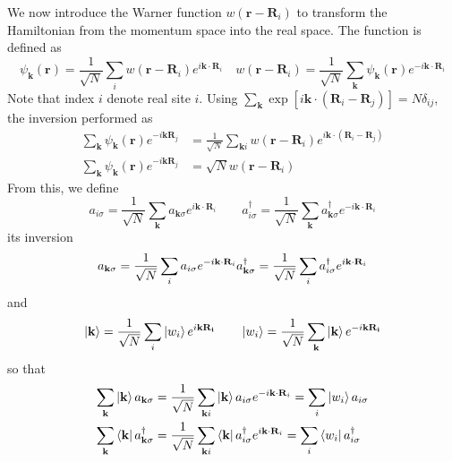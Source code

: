 \documentclass[../../../main.tex]{subfiles}
\begin{document}
We now introduce the Warner function $w(\mathbf{r} - \mathbf{R}_i)$ to transform the Hamiltonian from the momentum space into the real space.
The function is defined as
\begin{equation*}
    \psi_{\mathbf{k}}(\mathbf{r}) = \frac{1}{\sqrt{N}}\sum_{i} w(\mathbf{r}-\mathbf{R}_i)e^{i\mathbf{k}\cdot\mathbf{R}_i}\quad
    w(\mathbf{r}-\mathbf{R}_i) = \frac{1}{\sqrt{N}}\sum_{\mathbf{k}}\psi_{\mathbf{k}}(\mathbf{r})e^{-i\mathbf{k}\cdot\mathbf{R}_i}
\end{equation*}
Note that index $i$ denote real site $i$.
Using $\sum_{\mathbf{k}} \exp[i\mathbf{k}\cdot(\mathbf{R}_i-\mathbf{R}_j)] = N\delta_{ij}$, the inversion performed as
\begin{align*}
    \sum_{\mathbf{k}} \psi_{\mathbf{k}}(\mathbf{r}) e ^{-i \mathbf{k} \mathbf{R}_j} & = \frac{1}{\sqrt{N}}\sum_{\mathbf{k} i} w(\mathbf{r}-\mathbf{R}_i)e^{i\mathbf{k}\cdot(\mathbf{R}_i-\mathbf{R}_j)} \\
    \sum_{\mathbf{k}} \psi_{\mathbf{k}}(\mathbf{r}) e ^{-i \mathbf{k} \mathbf{R}_j} & = \sqrt{N} w(\mathbf{r}- \mathbf{R}_i)
\end{align*}
From this, we define
\begin{equation*}
    a_{i\sigma} = \frac{1}{\sqrt{N}}\sum_{\mathbf{k}} a_{\mathbf{k}\sigma} e^{i\mathbf{k}\cdot\mathbf{R}_i} \qquad
    a_{i\sigma}^{\dagger} = \frac{1}{\sqrt{N}}\sum_{\mathbf{k}} a_{\mathbf{k}\sigma}^{\dagger} e^{-i\mathbf{k}\cdot\mathbf{R}_i}
\end{equation*}
its inversion
\begin{equation*}
    a_{\mathbf{k}\sigma} = \frac{1}{\sqrt{N}}\sum_{i} a_{i \sigma}e^{-i\mathbf{k}\cdot\mathbf{R}_i} \\
    a_{\mathbf{k}\sigma}^{\dagger} = \frac{1}{\sqrt{N}}\sum_{i} a_{i \sigma}^{\dagger}e^{i\mathbf{k}\cdot\mathbf{R}_i}
\end{equation*}
and
\begin{equation*}
    \ket{\mathbf{k } } = \frac{1 }{\sqrt{N } } \sum_{i } \ket{w_i } e ^{i \mathbf{k }\mathbf{R_i}} \qquad
    \ket{w_i } = \frac{ 1 }{\sqrt{N }  } \sum_{\mathbf{k }} \ket{\mathbf{k} } e ^{-i \mathbf{k }\mathbf{R_i}}
\end{equation*}
so that
\begin{align*}
    \sum_{\mathbf{k} } \ket{\mathbf{k}} a_{\mathbf{k}\sigma}         & =  \frac{1}{\sqrt{N}}\sum_{\mathbf{k} i} \ket{\mathbf{k}}  a_{i \sigma}e^{-i\mathbf{k}\cdot\mathbf{R}_i} = \sum_{i}\ket{w_i} a_{i \sigma}                  \\
    \sum_{\mathbf{k} } \bra{\mathbf{k}} a_{\mathbf{k}\sigma}^\dagger & =  \frac{1}{\sqrt{N}}\sum_{\mathbf{k} i} \bra{\mathbf{k}}  a_{i \sigma}^\dagger e^{i\mathbf{k}\cdot\mathbf{R}_i} = \sum_{i}\bra{w_i} a_{i \sigma} ^\dagger
\end{align*}
\end{document}
